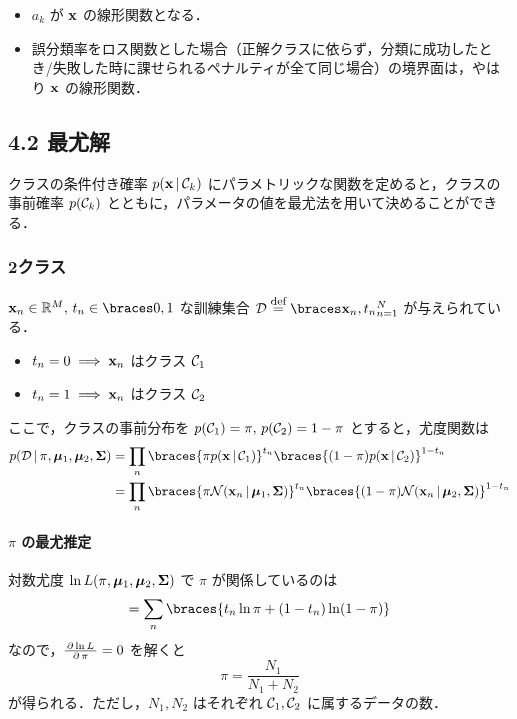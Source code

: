 \begin{itemize}
  \item $a_k$ が ${\mathbf{x}}$ の線形関数となる．
  \item 誤分類率をロス関数とした場合（正解クラスに依らず，分類に成功したとき/失敗した時に課せられるペナルティが全て同じ場合）の境界面は，やはり ${\mathbf{x}}$ の線形関数．
\end{itemize}

\setcounter{equation}{70}
\subsection*{4.2 最尤解}

クラスの条件付き確率 $p({\mathbf{x}} \,|\, {\mathcal{C}}_k)$ にパラメトリックな関数を定めると，クラスの事前確率 $p({\mathcal{C}}_k)$ とともに，パラメータの値を最尤法を用いて決めることができる．

\subsubsection*{2クラス}

$\vx_n \in \R^M,\, t_n \in \set{0,1}$ な訓練集合 $\cD \defeq \set{\vx_n, t_n}_{n=1}^N$ が与えられている．
\begin{itemize}
  \item $t_n = 0 \implies {\mathbf{x}}_n$ はクラス ${\mathcal{C}}_1$
  \item $t_n = 1 \implies {\mathbf{x}}_n$ はクラス ${\mathcal{C}}_2$
\end{itemize}

ここで，クラスの事前分布を $p({\mathcal{C}}_1) = \pi,\, p({\mathcal{C}}_2) = 1 - \pi$ とすると，尤度関数は
\begin{align}
  p(\cD \given \pi, \vmu_1, \vmu_2, \mSigma) & = \prod_n \braces{\pi p(\vx \given \cC_1)}^{t_n} \braces{(1 - \pi) p(\vx \given \cC_2)}^{1 - t_n} \notag \\
  & = \prod_n \braces{\pi \cN(\vx_n \given \vmu_1, \mSigma)}^{t_n} \braces{(1 - \pi) \cN(\vx_n \given \vmu_2, \mSigma)}^{1 - t_n}
\end{align}

\paragraph{$\pi$ の最尤推定}

対数尤度 $\ln L(\pi, \boldsymbol{\mu}_1, \boldsymbol{\mu}_2, \boldsymbol{\Sigma})$ で $\pi$ が関係しているのは
\begin{equation}
   = \sum_n \braces{t_n \ln \pi + (1-t_n)\ln(1 - \pi)}
\end{equation}
なので，$\frac{\,\partial{\, \ln L}\,}{\,\partial{\, \pi}\,} = 0$ を解くと
\begin{equation}
  \pi = \frac{N_1}{N_1 + N_2}
\end{equation}
が得られる．ただし，$N_1,N_2$ はそれぞれ ${\mathcal{C}}_1, {\mathcal{C}}_2$ に属するデータの数．

